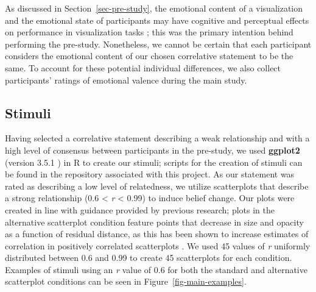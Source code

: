 \documentclass[manuscript,screen,review,anonymous]{acmart}
\begin{document}
As discussed in Section~\ref{sec-pre-study}, the emotional content of a
visualization and the emotional state of participants may have cognitive
and perceptual effects on performance in visualization tasks
\citep{phelps_2006, harrison_2013, thoresen_2016}; this was the primary
intention behind performing the pre-study. Nonetheless, we cannot be
certain that each participant considers the emotional content of our
chosen correlative statement to be the same. To account for these
potential individual differences, we also collect participants' ratings
of emotional valence during the main study.

\subsection{Stimuli}\label{sec-stimuli-main}

Having selected a correlative statement describing a weak relationship
and with a high level of consensus between participants in the
pre-study, we used \textbf{ggplot2} (version 3.5.1 \citep{ggplot}) in R
to create our stimuli; scripts for the creation of stimuli can be found
in the repository associated with this project. As our statement was
rated as describing a low level of relatedness, we utilize scatterplots
that describe a strong relationship (0.6 \textless{} \emph{r}
\textless{} 0.99) to induce belief change. Our plots were created in
line with guidance provided by previous research; plots in the
alternative scatterplot condition feature points that decrease in size
and opacity as a function of residual distance, as this has been shown
to increase estimates of correlation in positively correlated
scatterplots \citep{strain_2023, strain_2023b, strain_2024}. We used 45
values of \emph{r} uniformly distributed between 0.6 and 0.99 to create
45 scatterplots for each condition. Examples of stimuli using an
\emph{r} value of 0.6 for both the standard and alternative scatterplot
conditions can be seen in Figure~\ref{fig-main-examples}.
\end{document}

